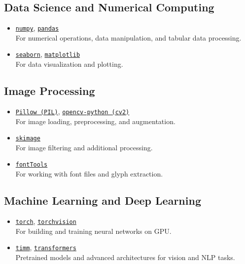 \documentclass[11pt,a4paper,oneside]{report}
\begin{document}
\subsection*{Data Science and Numerical Computing}
\begin{itemize}
    \item \href{https://numpy.org/}{\texttt{numpy}}, \href{https://pandas.pydata.org/}{\texttt{pandas}} \\
    For numerical operations, data manipulation, and tabular data processing.
    
    \item \href{https://seaborn.pydata.org/}{\texttt{seaborn}}, \href{https://matplotlib.org/}{\texttt{matplotlib}} \\
    For data visualization and plotting.
\end{itemize}

\subsection*{Image Processing}
\begin{itemize}
    \item \href{https://github.com/python-pillow/Pillow/}{\texttt{Pillow (PIL)}}, \href{https://opencv.org/}{\texttt{opencv-python (cv2)}} \\
    For image loading, preprocessing, and augmentation.
    
    \item \href{https://scikit-image.org/}{\texttt{skimage}} \\
    For image filtering and additional processing.
    
    \item \href{https://github.com/fonttools/fonttools}{\texttt{fontTools}} \\
    For working with font files and glyph extraction.
\end{itemize}

\subsection*{Machine Learning and Deep Learning}
\begin{itemize}
    \item \href{https://pytorch.org/}{\texttt{torch}}, \href{https://pytorch.org/vision/stable/index.html}{\texttt{torchvision}} \\
    For building and training neural networks on GPU.
    
    \item \href{https://github.com/huggingface/pytorch-image-models}{\texttt{timm}}, \href{https://huggingface.co/docs/transformers/index}{\texttt{transformers}} \\
    Pretrained models and advanced architectures for vision and NLP tasks.
\end{itemize}
\end{document}
